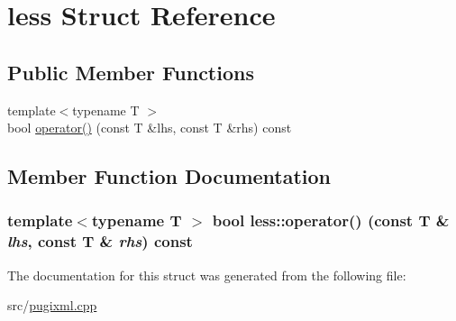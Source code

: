 \hypertarget{structless}{
\section{less Struct Reference}
\label{structless}
}
\subsection*{Public Member Functions}
\begin{DoxyCompactItemize}
\item 
{\footnotesize template$<$typename T $>$ }\\bool \hyperlink{structless_a0c27ef55a1c5a352989dff9c82a68da0}{operator()} (const T \&lhs, const T \&rhs) const 
\end{DoxyCompactItemize}


\subsection{Member Function Documentation}
\hypertarget{structless_a0c27ef55a1c5a352989dff9c82a68da0}{
\subsubsection[{operator()}]{\setlength{\rightskip}{0pt plus 5cm}template$<$typename T $>$ bool less::operator() (const T \& {\em lhs}, \/  const T \& {\em rhs}) const}}
\label{structless_a0c27ef55a1c5a352989dff9c82a68da0}


The documentation for this struct was generated from the following file:\begin{DoxyCompactItemize}
\item 
src/\hyperlink{pugixml_8cpp}{pugixml.cpp}\end{DoxyCompactItemize}
